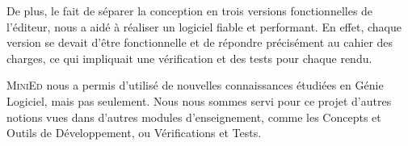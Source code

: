 \documentclass[a4paper]{article}
\begin{document}
	\vspace{0.5cm}

	De plus, le fait de séparer la conception en trois versions fonctionnelles de l'éditeur, nous a aidé à réaliser un logiciel fiable et performant. En effet, chaque version se devait d'être fonctionnelle et de répondre précisément au cahier des charges, ce qui impliquait une vérification et des tests pour chaque rendu. 

	\vspace{0.5cm}

	\textsc{MiniEd} nous a permis d’utilisé de nouvelles connaissances étudiées en Génie Logiciel, mais pas seulement. Nous nous sommes servi pour ce projet d'autres notions vues dans d’autres modules d'enseignement, comme les Concepts et Outils de Développement, ou Vérifications et Tests.
\end{document}
